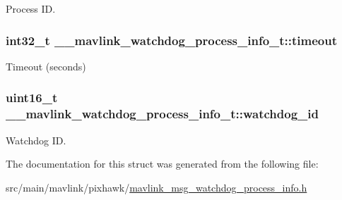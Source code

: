 Process I\+D. 

\hypertarget{struct____mavlink__watchdog__process__info__t_a55a9ddc8f87f75193de2146ae371e132}{
\subsubsection[{timeout}]{\setlength{\rightskip}{0pt plus 5cm}int32\+\_\+t \+\_\+\+\_\+mavlink\+\_\+watchdog\+\_\+process\+\_\+info\+\_\+t\+::timeout}}\label{struct____mavlink__watchdog__process__info__t_a55a9ddc8f87f75193de2146ae371e132}


Timeout (seconds) 

\hypertarget{struct____mavlink__watchdog__process__info__t_a626eb0598a339dfd38c45046e5dcbe9b}{
\subsubsection[{watchdog\+\_\+id}]{\setlength{\rightskip}{0pt plus 5cm}uint16\+\_\+t \+\_\+\+\_\+mavlink\+\_\+watchdog\+\_\+process\+\_\+info\+\_\+t\+::watchdog\+\_\+id}}\label{struct____mavlink__watchdog__process__info__t_a626eb0598a339dfd38c45046e5dcbe9b}


Watchdog I\+D. 



The documentation for this struct was generated from the following file\+:\begin{DoxyCompactItemize}
\item 
src/main/mavlink/pixhawk/\hyperlink{mavlink__msg__watchdog__process__info_8h}{mavlink\+\_\+msg\+\_\+watchdog\+\_\+process\+\_\+info.\+h}\end{DoxyCompactItemize}
